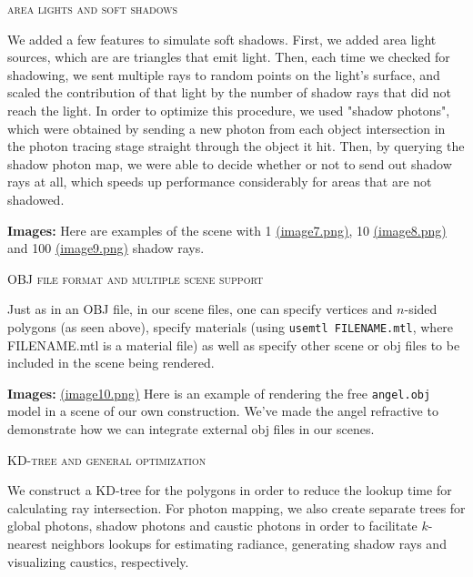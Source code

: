 \documentclass{article}
\begin{document}
\begin{center}\textsc{area lights and soft shadows}\end{center} 
We added a few features to simulate soft shadows. First, we added area light sources, which are are triangles that emit light. Then, each time we checked for shadowing, we sent multiple rays to random points on the light's surface, and scaled the contribution of that light by the number of shadow rays that did not reach the light. In order to optimize this procedure, we used "shadow photons", which were obtained by sending a new photon from each object intersection in the photon tracing stage straight through the object it hit. Then, by querying the shadow photon map, we were able to decide whether or not to send out shadow rays at all, which speeds up performance considerably for areas that are not shadowed.

\vspace{3mm}
{\bf Images:} Here are examples of the scene with 1 \href{run://images/image7.png}{\underline{(image7.png)}}, 10 \href{run://images/image8.png}{\underline{(image8.png)}} and 100 \href{run://images/image9.png}{\underline{(image9.png)}} shadow rays.

\begin{center}\textsc{OBJ file format and multiple scene support}\end{center} 
Just as in an OBJ file, in our scene files, one can specify vertices and $n$-sided polygons (as seen above), specify materials (using \verb+usemtl FILENAME.mtl+, where FILENAME.mtl is a material file) as well as specify other scene or obj files to be included in the scene being rendered.

\vspace{3mm}
{\bf Images:} \href{run://images/image10.png}{\underline{(image10.png)}} Here is an example of rendering the free \verb+angel.obj+ model in a scene of our own construction. We've made the angel refractive to demonstrate how we can integrate external obj files in our scenes.

\begin{center}\textsc{KD-tree and general optimization}\end{center} 
We construct a KD-tree for the polygons in order to reduce the lookup time for calculating ray intersection. For photon mapping, we also create separate trees for global photons, shadow photons and caustic photons in order to facilitate $k$-nearest neighbors lookups for estimating radiance, generating shadow rays and visualizing caustics, respectively.
\end{document}

